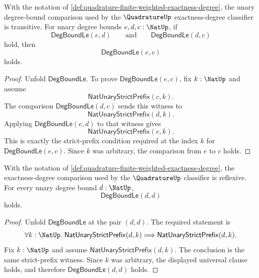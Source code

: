 \begin{theorem}
\label{thm:quadrature-degree-bound-comparison-transitive}
With the notation of \autoref{def:quadrature-finite-weighted-exactness-degree}, the unary degree-bound comparison used by the $\QuadratureUp$ exactness-degree classifier is transitive. For unary degree bounds $e,d,c:\NatUp$, if
$$
\mathsf{DegBoundLe}(e,d)
\qquad\text{and}\qquad
\mathsf{DegBoundLe}(d,c)
$$
hold, then
$$
\mathsf{DegBoundLe}(e,c)
$$
holds.
\end{theorem}
\begin{proof}
Unfold $\mathsf{DegBoundLe}$. To prove $\mathsf{DegBoundLe}(e,c)$, fix $k:\NatUp$ and assume
$$
\mathsf{NatUnaryStrictPrefix}(c,k).
$$
The comparison $\mathsf{DegBoundLe}(d,c)$ sends this witness to
$$
\mathsf{NatUnaryStrictPrefix}(d,k).
$$
Applying $\mathsf{DegBoundLe}(e,d)$ to that witness gives
$$
\mathsf{NatUnaryStrictPrefix}(e,k).
$$
This is exactly the strict-prefix condition required at the index $k$ for $\mathsf{DegBoundLe}(e,c)$. Since $k$ was arbitrary, the comparison from $e$ to $c$ holds.
\end{proof}

\begin{theorem}
\label{thm:quadrature-degree-bound-comparison-reflexive}
With the notation of \autoref{def:quadrature-finite-weighted-exactness-degree}, the exactness-degree comparison used by the $\QuadratureUp$ classifier is reflexive. For every unary degree bound $d:\NatUp$,
$$
\mathsf{DegBoundLe}(d,d)
$$
holds.
\end{theorem}
\begin{proof}
Unfold $\mathsf{DegBoundLe}$ at the pair $(d,d)$. The required statement is
$$
\forall k:\NatUp.\;
\mathsf{NatUnaryStrictPrefix}(d,k)
\Longrightarrow
\mathsf{NatUnaryStrictPrefix}(d,k).
$$
Fix $k:\NatUp$ and assume $\mathsf{NatUnaryStrictPrefix}(d,k)$. The conclusion is the same strict-prefix witness. Since $k$ was arbitrary, the displayed universal clause holds, and therefore $\mathsf{DegBoundLe}(d,d)$ holds.
\end{proof}

